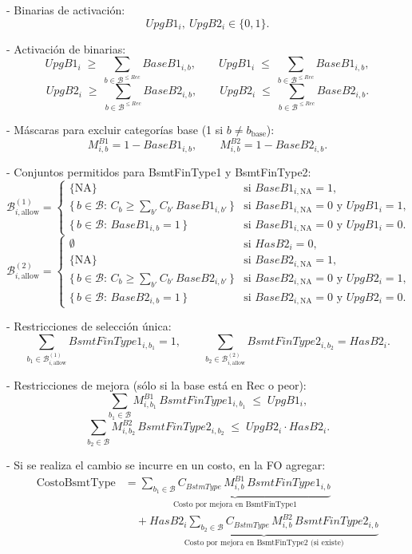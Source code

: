 \begin{itemize}
- Binarias de activación:
\[
  UpgB1_i,\ UpgB2_i \in \{0,1\}.
\]

- Activación de binarias:
\[
  UpgB1_i \;\ge\; \sum_{b\in\mathcal{B}^{\le Rec}} BaseB1_{i,b},\qquad
  UpgB1_i \;\le\; \sum_{b\in\mathcal{B}^{\le Rec}} BaseB1_{i,b},
\]
\[
  UpgB2_i \;\ge\; \sum_{b\in\mathcal{B}^{\le Rec}} BaseB2_{i,b},\qquad
  UpgB2_i \;\le\; \sum_{b\in\mathcal{B}^{\le Rec}} BaseB2_{i,b}.
\]

- Máscaras para excluir categorías base (1 si $b \neq b_{\text{base}}$):
\[
M^{B1}_{i,b} = 1 - BaseB1_{i,b},\qquad
M^{B2}_{i,b} = 1 - BaseB2_{i,b}.
\]

- Conjuntos permitidos para BsmtFinType1 y BsmtFinType2:
\[
  \mathcal{B}^{(1)}_{i,\text{allow}} =
  \begin{cases}
    \{\text{NA}\} & \text{si } BaseB1_{i,\text{NA}}=1,\\[3pt]
    \{\, b\in\mathcal{B}:\, C_b \ge \sum_{b'}C_{b'}\,BaseB1_{i,b'} \,\} & \text{si } BaseB1_{i,\text{NA}}=0 \text{ y } UpgB1_i=1,\\[3pt]
    \{\, b\in\mathcal{B}:\, BaseB1_{i,b}=1 \,\} & \text{si } BaseB1_{i,\text{NA}}=0 \text{ y } UpgB1_i=0.
  \end{cases}
\]
\[
  \mathcal{B}^{(2)}_{i,\text{allow}} =
  \begin{cases}
    \emptyset & \text{si } HasB2_i=0,\\[3pt]
    \{\text{NA}\} & \text{si } BaseB2_{i,\text{NA}}=1,\\[3pt]
    \{\, b\in\mathcal{B}:\, C_b \ge \sum_{b'}C_{b'}\,BaseB2_{i,b'} \,\} & \text{si } BaseB2_{i,\text{NA}}=0 \text{ y } UpgB2_i=1,\\[3pt]
    \{\, b\in\mathcal{B}:\, BaseB2_{i,b}=1 \,\} & \text{si } BaseB2_{i,\text{NA}}=0 \text{ y } UpgB2_i=0.
  \end{cases}
\]

- Restricciones de selección única:
\[
  \sum_{b_1\in\mathcal{B}^{(1)}_{i,\text{allow}}} BsmtFinType1_{i,b_1}=1,\qquad
  \sum_{b_2\in\mathcal{B}^{(2)}_{i,\text{allow}}} BsmtFinType2_{i,b_2}=HasB2_i.
\]

- Restricciones de mejora (sólo si la base está en Rec o peor):
\[
  \sum_{b_1\in\mathcal{B}} M^{B1}_{i,b_1}\,BsmtFinType1_{i,b_1} \;\le\; UpgB1_i,
\]
\[
  \sum_{b_2\in\mathcal{B}} M^{B2}_{i,b_2}\,BsmtFinType2_{i,b_2} \;\le\; UpgB2_i \cdot HasB2_i.
\]

- Si se realiza el cambio se incurre en un costo, en la FO agregar:
\[
\begin{aligned}
\text{CostoBsmtType}
&=
\underbrace{\sum_{b_1\in\mathcal{B}}
C_{BstmType}\, M^{B1}_{i,b}\, BsmtFinType1_{i,b}}_{\text{Costo por mejora en BsmtFinType1}}\\[4pt]
&\quad
+\underbrace{HasB2_i
\sum_{b_2\in\mathcal{B}}
C_{BstmType}\, M^{B2}_{i,b}\, BsmtFinType2_{i,b}}_{\text{Costo por mejora en BsmtFinType2 (si existe)}}
\end{aligned}
\]


\end{itemize}
